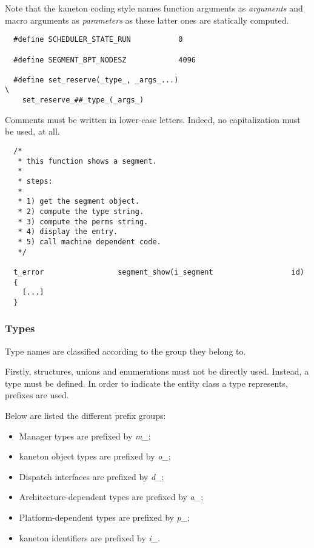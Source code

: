 Note that the kaneton coding style names function arguments as
\textit{arguments} and macro arguments as \textit{parameters} as these
latter ones are statically computed.

\begin{verbatim}
  #define SCHEDULER_STATE_RUN           0

  #define SEGMENT_BPT_NODESZ            4096

  #define set_reserve(_type_, _args_...)                                \
    set_reserve_##_type_(_args_)
\end{verbatim}

Comments must be written in lower-case letters. Indeed, no capitalization
must be used, at all.

\begin{verbatim}
  /*
   * this function shows a segment.
   *
   * steps:
   *
   * 1) get the segment object.
   * 2) compute the type string.
   * 3) compute the perms string.
   * 4) display the entry.
   * 5) call machine dependent code.
   */

  t_error                 segment_show(i_segment                  id)
  {
    [...]
  }
\end{verbatim}


\subsubsection{Types}

Type names are classified according to the group they belong to.

Firstly, structures, unions and enumerations must not be directly used.
Instead, a type must be defined. In order to indicate the entity class a type
represents, prefixes are used.

Below are listed the different prefix groups:

\begin{itemize}
  \item
    Manager types are prefixed by \textit{m\_};
  \item
    kaneton object types are prefixed by \textit{o\_};
  \item
    Dispatch interfaces are prefixed by \textit{d\_};
  \item
    Architecture-dependent types are prefixed by \textit{a\_};
  \item
    Platform-dependent types are prefixed by \textit{p\_};
  \item
    kaneton identifiers are prefixed by \textit{i\_}.
\end{itemize}

